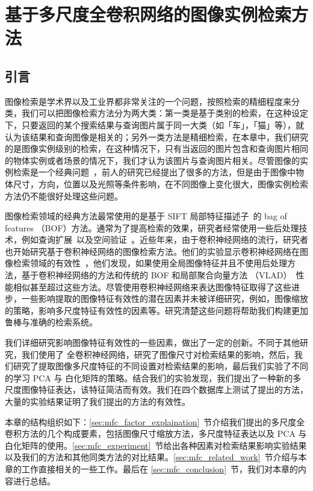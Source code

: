 
\chapter{基于多尺度全卷积网络的图像实例检索方法}\label{chapter:mfc}
\section{引言}
图像检索是学术界以及工业界都非常关注的一个问题，按照检索的精细程度来分类，我们可以把图像检索方法分为两大类：第一类是基于类别的检索，在这种设定下，只要返回的某个搜索结果与查询图片属于同一大类（如「车」，「猫」等），就认为该结果和查询图像是相关的；另外一类方法是精细检索，在本章中，我们研究的是图像实例级别的检索，在这种情况下，只有当返回的图片包含和查询图片相同的物体实例或者场景的情况下，我们才认为该图片与查询图片相关。尽管图像的实例检索是一个经典问题~\cite{Sivic2003VideoGA,Nistr2006ScalableRW,Philbin2007ObjectRW,Razavian2014CNNFO,Babenko2014NeuralCF,Tolias2015ParticularOR,Babenko2015AggregatingLD}，前人的研究已经提出了很多的方法，但是由于图像中物体尺寸，方向，位置以及光照等条件影响，在不同图像上变化很大，图像实例检索方法仍不能很好处理这些问题。

图像检索领域的经典方法最常使用的是基于 SIFT 局部特征描述子~\cite{Lowe2004DistinctiveIF}的 bag of features （BOF）方法。通常为了提高检索的效果，研究者经常使用一些后处理技术，例如查询扩展~\cite{Chum2007TotalRA}以及空间验证~\cite{Philbin2007ObjectRW}。近些年来，由于卷积神经网络的流行，研究者也开始研究基于卷积神经网络的图像检索方法。他们的实验显示卷积神经网络在图像检索领域的有效性~\cite{Babenko2014NeuralCF,Razavian2014CNNFO,Tolias2015ParticularOR}，他们发现，如果使用全局图像特征并且不使用后处理方法，基于卷积神经网络的方法和传统的 BOF 和局部聚合向量方法 （VLAD）~\cite{Jgou2010AggregatingLD}性能相似甚至超过这些方法。尽管使用卷积神经网络来表达图像特征取得了这些进步，一些影响提取的图像特征有效性的潜在因素并未被详细研究，例如，图像缩放的策略，影响多尺度特征有效性的因素等。研究清楚这些问题将帮助我们构建更加鲁棒与准确的检索系统。

我们详细研究影响图像特征有效性的一些因素，做出了一定的创新。不同于其他研究，我们使用了
全卷积神经网络，研究了图像尺寸对检索结果的影响，然后，我们研究了提取图像多尺度特征的不同设置对检索结果的影响，最后我们实验了不同的学习 PCA 与 白化矩阵的策略。结合我们的实验发现，我们提出了一种新的多尺度图像特征表达，该特征简洁而有效。我们在四个数据库上测试了提出的方法，大量的实验结果证明了我们提出的方法的有效性。

本章的结构组织如下：\ref{sec:mfc_factor_explaination}~节介绍我们提出的多尺度全卷积方法的几个构成要素，包括图像尺寸缩放方法，多尺度特征表达以及 PCA 与白化矩阵的使用。\ref{sec:mfc_experiment}~节给出各种因素对检索结果影响实验结果以及我们的方法和其他同类方法的对比结果。\ref{sec:mfc_related_work}~节介绍与本章的工作直接相关的一些工作。最后在 \ref{sec:mfc_conclusion}~节，我们对本章的内容进行总结。

